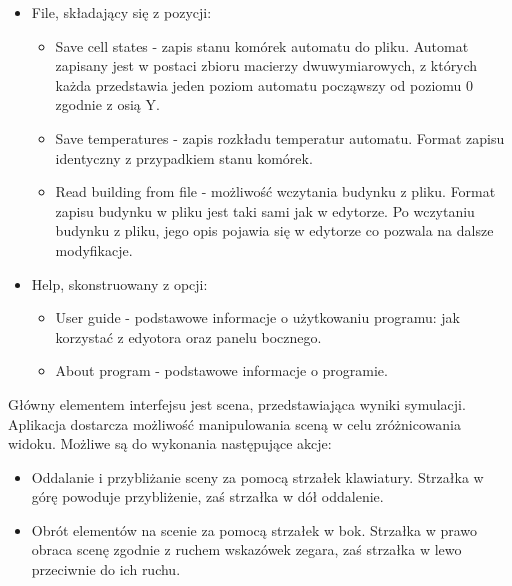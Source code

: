 \begin{itemize}
\item File, składający się z pozycji:
\begin{itemize}
\item Save cell states - zapis stanu komórek automatu do pliku. Automat zapisany jest w postaci zbioru macierzy dwuwymiarowych, z których każda przedstawia jeden poziom automatu począwszy od poziomu 0 zgodnie z osią Y.
\item Save temperatures - zapis rozkładu temperatur automatu. Format zapisu identyczny z przypadkiem stanu komórek.
\item Read building from file - możliwość wczytania budynku z pliku. Format zapisu budynku w pliku jest taki sami jak w edytorze.
	Po wczytaniu budynku z pliku, jego opis pojawia się w edytorze co pozwala na dalsze modyfikacje.
\end {itemize}
\item Help, skonstruowany z opcji:
\begin {itemize}
\item User guide - podstawowe informacje o użytkowaniu programu: jak korzystać z edyotora oraz panelu bocznego.
\item About program - podstawowe informacje o programie.
\end {itemize}
\end{itemize}


Główny elementem interfejsu jest scena, przedstawiająca wyniki symulacji. Aplikacja dostarcza możliwość manipulowania sceną w celu zróżnicowania widoku. Możliwe są do wykonania następujące akcje:
\begin {itemize}
\item Oddalanie i przybliżanie sceny za pomocą strzałek klawiatury. Strzałka w górę powoduje przybliżenie, zaś strzałka w dół oddalenie.
\item Obrót elementów na scenie za pomocą strzałek w bok. Strzałka w prawo obraca scenę zgodnie z ruchem wskazówek zegara, zaś strzałka w lewo przeciwnie do ich ruchu.
\end {itemize}

